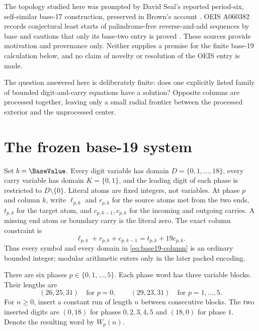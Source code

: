 \documentclass[11pt,twoside]{article}
\theoremstyle{remark}
\begin{document}
The topology studied here was prompted by David Seal's reported period-six,
self-similar base-17 construction, preserved in Brown's account
\cite{brownSeal}.  OEIS A060382 records conjectural least starts of
palindrome-free reverse-and-add sequences by base and cautions that only its
base-two entry is proved \cite{oeisA060382}.  These sources provide motivation
and provenance only.  Neither supplies a premise for the finite base-19
calculation below, and no claim of novelty or resolution of the OEIS entry is
made.

\begin{keyidea}
The question answered here is deliberately finite: does one explicitly
listed family of bounded digit-and-carry equations have a solution?  Opposite
columns are processed together, leaving only a small radial frontier between
the processed exterior and the unprocessed center.
\end{keyidea}

\section{The frozen base-19 system}
\label{sec:frozen-system}

Set $b=\BaseValue$.  Every digit variable has domain
$D=\{0,1,\ldots,18\}$, every carry variable has domain $K=\{0,1\}$, and
the leading digit of each phase is restricted to $D\setminus\{0\}$.  Literal
atoms are fixed integers, not variables.  At phase $p$ and column $k$, write
$\ell_{p,k}$ and $r_{p,k}$ for the source atoms met from the two ends,
$t_{p,k}$ for the target atom, and $c_{p,k-1},c_{p,k}$ for the incoming and
outgoing carries.  A missing end atom or boundary carry is the literal zero.
The exact column constraint is
\begin{equation}
  \ell_{p,k}+r_{p,k}+c_{p,k-1}
  =t_{p,k}+19c_{p,k}.
  \label{eq:base19-column}
\end{equation}
Thus every symbol and every domain in \cref{eq:base19-column} is an ordinary
bounded integer; modular arithmetic enters only in the later packed encoding.

There are six phases $p\in\{0,1,\ldots,5\}$.  Each phase word has three
variable blocks.  Their lengths are
\[
  (26,25,31) \quad\text{for }p=0,
  \qquad
  (29,23,31) \quad\text{for }p=1,\ldots,5.
\]
For $n\geq 0$, insert a constant run of length $n$ between consecutive
blocks.  The two inserted digits are $(0,18)$ for phases $0,2,3,4,5$ and
$(18,0)$ for phase $1$.  Denote the resulting word by $W_p(n)$.
\end{document}
